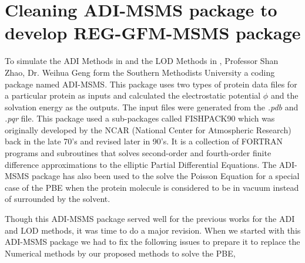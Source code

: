 

\section{Cleaning ADI-MSMS package to develop REG-GFM-MSMS package}	
To simulate the ADI Methods in \cite{Geng2013_Fully} and the LOD Methods in \cite{Wilson2016}, Professor Shan Zhao, Dr. Weihua Geng form the Southern Methodists University a coding package named ADI-MSMS. This package uses two types of protein data files for a particular protein as inputs and calculated the electrostatic potential $\phi$ and the solvation energy as the outputs. The input files were generated from the {\it .pdb} and {\it .pqr } file. This package used a sub-packages called  FISHPACK90 which was originally developed by the NCAR (National Center for Atmospheric Research) back in the late 70's and revised later in 90's. It is a collection of FORTRAN programs and subroutines that solves second-order and fourth-order finite difference approximations to  the elliptic Partial Differential Equations. The ADI-MSMS package has also been used to the solve the Poisson Equation for a special case of the PBE when the protein molecule is considered to be in vacuum instead of surrounded by the solvent.




Though this ADI-MSMS package served well for the previous works for the ADI and LOD methods, it was time to do a major revision. When we started with this ADI-MSMS package we had to fix the following issues to prepare it to replace the Numerical methods by our proposed methods to solve the PBE,

